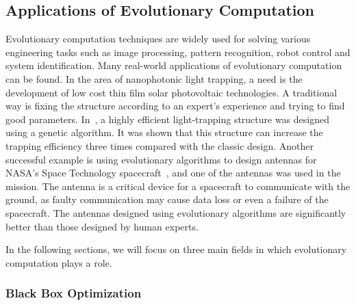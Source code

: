 \subsection{Applications of Evolutionary Computation}\label{sec:application_evolutionary_computation}

Evolutionary computation techniques are widely used for solving various engineering tasks such as image processing, pattern recognition, robot control and system identification. 
Many real-world applications of evolutionary computation can be found. In the area of nanophotonic light trapping, a need is the development of low cost thin film solar photovoltaic technologies. A traditional way is fixing the structure according to an expert's experience and trying to find good parameters. In~\cite{Wang2013}, a highly efficient light-trapping structure was designed using a genetic algorithm. It was shown that this structure can increase the trapping efficiency three times compared with the classic design. Another successful example is using evolutionary algorithms to design antennas for NASA's Space Technology spacecraft~\cite{Hornby2011}, and one of the antennas was used in the mission. The antenna is a critical device for a spacecraft to communicate with the ground, as faulty communication may cause data loss or even a failure of the spacecraft. The antennas designed using evolutionary algorithms are significantly better than those designed by human experts. 

In the following sections, we will focus on three main fields in which evolutionary computation plays a role.



\subsubsection{Black Box Optimization}\label{sec:black_box_optimization}

